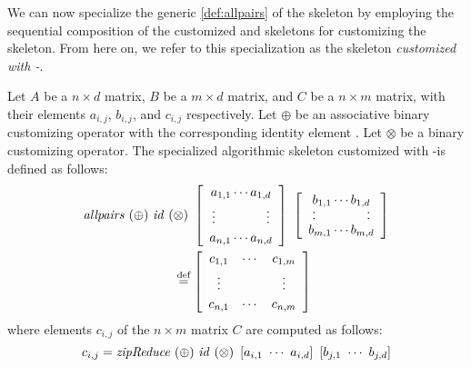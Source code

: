 We can now specialize the generic \autoref{def:allpairs} of the \allpairs skeleton by employing the sequential composition of the customized \reduce and \zip skeletons for customizing the \allpairs skeleton.
From here on, we refer to this specialization as the \allpairs skeleton \emph{customized with \zip-\reduce}.

\begin{definition}
  \label{def:allpairs:specialized}
  Let $A$ be a $n\times d$ matrix, $B$ be a $m\times d$ matrix, and $C$ be a $n\times m$ matrix, with their elements $a_{i,j}$, $b_{i,j}$, and $c_{i,j}$ respectively.
  Let $\oplus$ be an associative binary customizing operator with the corresponding identity element \id.
  Let $\otimes$ be a binary customizing operator.
  The specialized algorithmic skeleton \allpairs customized with \zip-\reduce is defined as follows:
  \begin{equation*}
    \begin{split}
      \allpairs\ (\oplus)\ \id\ (&\otimes)\ %
      \left[ \begin{array}{c} a_{1,1} \cdots a_{1,d}\\[.25em] \vdots \hspace{4em} \vdots\\[.25em] a_{n,1} \cdots a_{n,d} \end{array}\right]\ %
      \left[ \begin{array}{c} b_{1,1} \cdots b_{1,d}\\[-.25em] \cdot \hspace{4em} \cdot\\[-.75em] \cdot \hspace{4em} \cdot\\[-.25em] b_{m,1} \cdots b_{m,d} \end{array}\right]%
      \\
    &\eqdef \left[ \begin{array}{ccc} c_{1,1} & \cdots & c_{1,m}\\[.25em] \vdots & & \vdots\\[.25em] c_{n,1} & \cdots & c_{n,m} \end{array} \right]
    \end{split}
  \end{equation*}
  where elements $c_{i,j}$ of the $n\times m$ matrix $C$ are computed as follows:
  \[
    c_{i,j} = \text{\textit{zipReduce}}\ (\oplus)\ \text{\textit{id}}\ (\otimes)\ \left[a_{i,1}\ \cdots\ a_{i,d}\right]\ \left[b_{j,1}\ \cdots\ b_{j,d}\right]
  \]
\end{definition}


